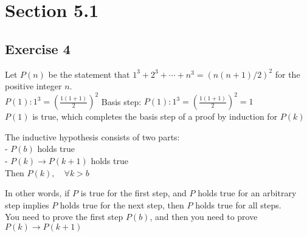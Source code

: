 \documentclass[12pt]{article}
\begin{document}
    \section{Section 5.1} 

    \subsection{Exercise 4}
    Let $P(n)$ be the statement that $1^3 + 2^3 + \cdots + n^3 = (n(n + 1)/2)^2$ for the positive integer $n$.\\
        
        $P(1): 1^3 = (\frac{1(1+1)}{2})^2$
        Basis step:
            $P(1): 1^3 = (\frac{1(1+1)}{2})^2 = 1$ \\
            $P(1)$ is true, which completes the basis step of a proof by
                induction for $P(k)$
    
        The inductive hypothesis consists of two parts: \\
            - $P(b)$ holds true \\
            - $P(k) \rightarrow P(k+1)$ holds true\\
            Then $P(k), \quad \forall k > b$
    
            In other words, if $P$ is true for the first step, and $P$ holds true for an arbitrary step implies $P$ holds true for the next step, then $P$ holds true for all steps. \\
    
        You need to prove the first step $P(b)$, and then you need to prove
            $P(k) \rightarrow P(k+1)$
    
\end{document}
